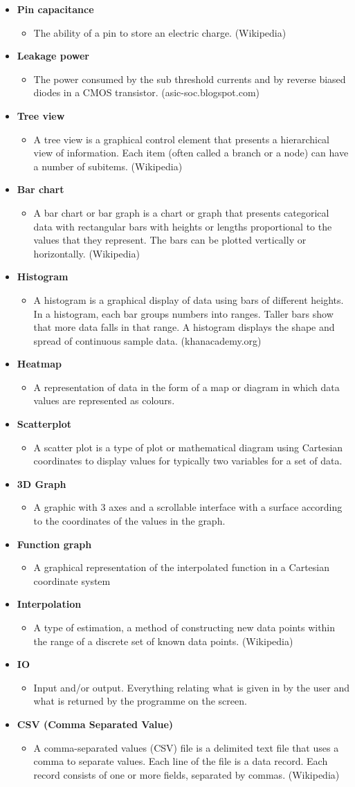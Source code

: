 \documentclass[10pt,a4paper]{report}
\newcommand{\itemglo}[3]{
    \label{glo:#1}\textbf{#2}
    \begin{itemize}[noitemsep, topsep=0pt, label=]
        \item #3
    \end{itemize}
}
\begin{document}
\begin{itemize}[label=]
    \item \itemglo{pin_capacitance}{Pin capacitance}{
    The ability of a pin to store an electric charge. (Wikipedia)}
    \item \itemglo{leakage_power}{Leakage power}{
    The power consumed by the sub threshold currents and by reverse biased diodes in a CMOS transistor. (asic-soc.blogspot.com)}
    \item \itemglo{tree_view}{Tree view}{
    A tree view is a graphical control element that presents a hierarchical view of information. Each item (often called a branch or a node) can have a number of subitems. (Wikipedia)}
    \item \itemglo{bar_chart}{Bar chart}{
    A bar chart or bar graph is a chart or graph that presents categorical data with rectangular bars with heights or lengths proportional to the values that they represent. The bars can be plotted vertically or horizontally. (Wikipedia)}
    \item \itemglo{histogram}{Histogram}{
    A histogram is a graphical display of data using bars of different heights. In a histogram, each bar groups numbers into ranges. Taller bars show that more data falls in that range. A histogram displays the shape and spread of continuous sample data. (khanacademy.org)}
    \item \itemglo{heatmap}{Heatmap}{A representation of data in the form of a map or diagram in which data values are represented as colours.}
    \item \itemglo{scatterplot}{Scatterplot}{A scatter plot is a type of plot or mathematical diagram using Cartesian coordinates to display values for typically two variables for a set of data.}
    \item \itemglo{3d_graph}{3D Graph}{
    A graphic with 3 axes and a scrollable interface with a surface according to the coordinates of the values in the graph.}
    \item \itemglo{function_graph}{Function graph}{A graphical representation of the interpolated function in a Cartesian coordinate system}
    \item \itemglo{interpolation}{Interpolation}{A type of estimation, a method of constructing new data points within the range of a discrete set of known data points. (Wikipedia)}
    \item \itemglo{io}{IO}{Input and/or output. Everything relating what is given in by the user and what is returned by the programme on the screen.}
    \item \itemglo{csv}{CSV (Comma Separated Value)}{A comma-separated values (CSV) file is a delimited text file that uses a comma to separate values. Each line of the file is a data record. Each record consists of one or more fields, separated by commas. (Wikipedia)}

\end{itemize}
\end{document}
